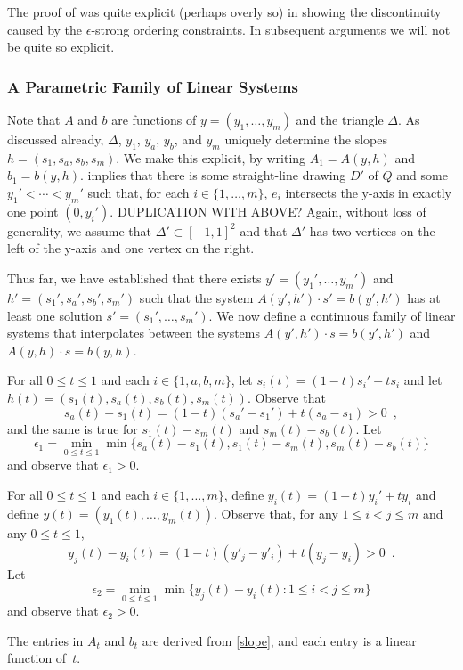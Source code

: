 \documentclass{patmorin}
\begin{document}
The proof of  was quite explicit (perhaps overly so)
in showing the discontinuity caused by the $\epsilon$-strong ordering
constraints.  In subsequent arguments we will not be quite so explicit.

\subsubsection{A Parametric Family of Linear Systems}

Note that $A$ and $b$ are functions of $y=(y_1,\ldots,y_m)$ and
the triangle $\Delta$. As discussed already, $\Delta$, $y_1$, $y_a$,
$y_b$, and $y_m$ uniquely determine the slopes $h=(s_1,s_a,s_b,s_m)$.
We make this explicit, by writing
$A_1=A(y,h)$ and $b_1=b(y,h)$.
implies that there is some straight-line drawing $D'$ of $Q$ and some
$y_1'<\cdots< y_m'$ such that, for each $i\in\{1,\ldots,m\}$, $e_i$
intersects the y-axis in exactly one point $(0,y_i')$.
DUPLICATION WITH ABOVE?
  Again, without
loss of generality, we assume that $\Delta'\subset [-1,1]^2$ and that
$\Delta'$ has two vertices on the left of the y-axis and one vertex on
the right.

Thus far, we have established that there exists $y'=(y_1',\ldots,y_m')$
and $h'=(s_1',s_a',s_b',s_m')$ such that the system
$A(y',h')\cdot s' = b(y',h')$ has at least one solution
$s'=(s_1',\ldots,s_m')$.  We now define a continuous family of linear
systems that interpolates between the systems $A(y',h')\cdot
s=b(y',h')$ and $A(y,h)\cdot s=b(y,h)$.

For all $0\le t\le 1$ and each $i\in\{1,a,b,m\}$, 
let $s_i(t)=(1-t)s_i' + ts_i$ and let
$h(t)=(s_1(t),s_a(t),s_b(t),s_m(t))$.
Observe that
\[  
    s_a(t)-s_1(t) = (1-t)(s_a'-s_1') + t(s_a-s_1) > 0 \enspace ,
\]
and the same is true for $s_1(t)-s_m(t)$ and $s_m(t)-s_b(t)$.  Let
\[
     \epsilon_1 = \min_{0\le t\le 1}\min\{s_a(t)-s_1(t), s_1(t)-s_m(t), s_m(t)-s_b(t)\}
\]
and observe that $\epsilon_1>0$.

For all $0\le t\le 1$ and each $i\in\{1,\ldots,m\}$, define $y_i(t) = (1-t)y_i' + ty_i$ and define $y(t)=(y_1(t),\ldots,y_m(t))$.
Observe that, for any
$1\le i< j\le m$ and any $0\le t\le 1$,
\[
   y_j(t) - y_i(t) = (1-t)(y'_j-y'_i) + t(y_j-y_i) > 0 \enspace .
\]
Let 
\[    \epsilon_2=\min_{0\le t\le 1}\min\{y_j(t)-y_i(t): 1\le i< j\le m\}
\]
and observe that $\epsilon_2 >0$.  

The entries in $A_t$ and $b_t$ are derived from \eqref{slope}, and
each entry is a linear function of~$t$.  
\end{document}
